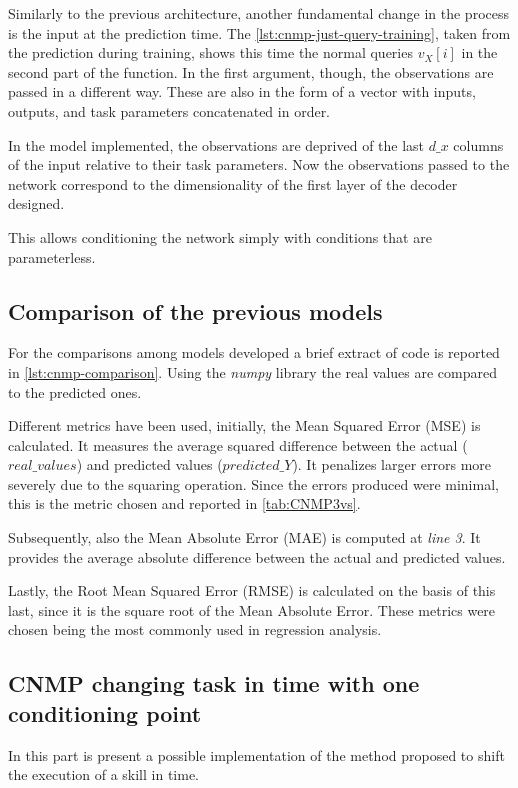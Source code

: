Similarly to the previous architecture, another fundamental change in the process is the input at the prediction time. The \cref{lst:cnmp-just-query-training}, taken from the prediction during training, shows this time the normal queries $v_X [ i ]$ in the second part of the function. In the first argument, though, the observations are passed in a different way. These are also in the form of a vector with inputs, outputs, and task parameters concatenated in order. 

In the model implemented, the observations are deprived of the last $d\_x$ columns of the input relative to their task parameters. Now the observations passed to the network correspond to the dimensionality of the first layer of the decoder designed.

This allows conditioning the network simply with conditions that are parameterless. 


\subsection{Comparison of the previous models}

For the comparisons among models developed a brief extract of code is reported in \cref{lst:cnmp-comparison}. Using the \emph{numpy} library the real values are compared to the predicted ones. 

Different metrics have been used, initially, the Mean Squared Error (MSE) is calculated. It measures the average squared difference between the actual ($real\_values$) and predicted values ($predicted\_Y$). It penalizes larger errors more severely due to the squaring operation. Since the errors produced were minimal, this is the metric chosen and reported in \cref{tab:CNMP3vs}.

Subsequently, also the Mean Absolute Error (MAE) is computed at \emph{line 3}. It provides the average absolute difference between the actual and predicted values.

Lastly, the Root Mean Squared Error (RMSE) is calculated on the basis of this last, since it is the square root of the Mean Absolute Error. These metrics were chosen being the most commonly used in regression analysis.




\subsection{CNMP changing task in time with one conditioning point}
In this part is present a possible implementation of the method proposed to shift the execution of a skill in time.

